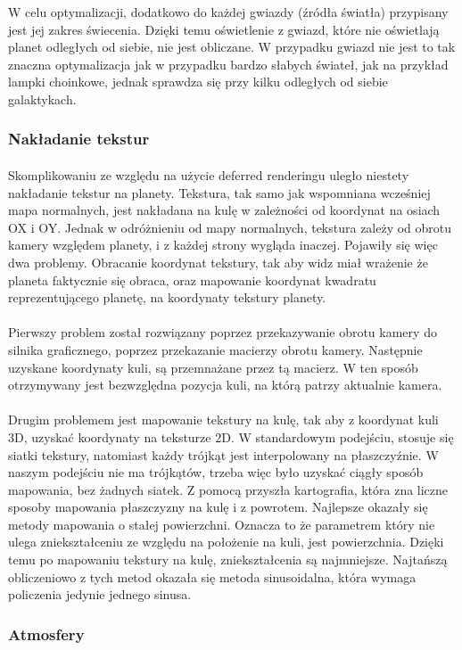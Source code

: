W celu optymalizacji, dodatkowo do każdej gwiazdy (źródła światła) przypisany jest jej zakres świecenia. Dzięki temu oświetlenie z gwiazd, które nie oświetlają planet odległych od siebie, nie jest obliczane. W przypadku gwiazd nie jest to tak znaczna optymalizacja jak w przypadku bardzo słabych świateł, jak na przykład lampki choinkowe, jednak sprawdza się przy kilku odległych od siebie galaktykach.

\subsubsection{Nakładanie tekstur}\label{ssub:nakladanie tekstur}
\paragraph{}

Skomplikowaniu ze względu na użycie deferred renderingu uległo niestety nakładanie tekstur na planety. Tekstura, tak samo jak wspomniana wcześniej mapa normalnych, jest nakładana na kulę w zależności od koordynat na osiach OX i OY. Jednak w odróżnieniu od mapy normalnych, tekstura zależy od obrotu kamery względem planety, i z każdej strony wygląda inaczej. Pojawiły się więc dwa problemy. Obracanie koordynat tekstury, tak aby widz miał wrażenie że planeta faktycznie się obraca, oraz mapowanie koordynat kwadratu reprezentującego planetę, na koordynaty tekstury planety.

\paragraph{}

Pierwszy problem został rozwiązany poprzez przekazywanie obrotu kamery do silnika graficznego, poprzez przekazanie macierzy obrotu kamery. Następnie uzyskane koordynaty kuli, są przemnażane przez tą macierz. W ten sposób otrzymywany jest bezwzględna pozycja kuli, na którą patrzy aktualnie kamera.

\paragraph{}

Drugim problemem jest mapowanie tekstury na kulę, tak aby z koordynat kuli 3D, uzyskać koordynaty na teksturze 2D. W standardowym podejściu, stosuje się siatki tekstury, natomiast każdy trójkąt jest interpolowany na płaszczyźnie. W naszym podejściu nie ma trójkątów, trzeba więc było uzyskać ciągły sposób mapowania, bez żadnych siatek. Z pomocą przyszła kartografia, która zna liczne sposoby mapowania płaszczyzny na kulę i z powrotem. Najlepsze okazały się metody mapowania o stałej powierzchni. Oznacza to że parametrem który nie ulega zniekształceniu ze względu na położenie na kuli, jest powierzchnia. Dzięki temu po mapowaniu tekstury na kulę, zniekształcenia są najmniejsze. Najtańszą obliczeniowo z tych metod okazała się metoda sinusoidalna, która wymaga policzenia jedynie jednego sinusa.

\subsubsection{Atmosfery}\label{ssub:atmosfery}
\paragraph{}

